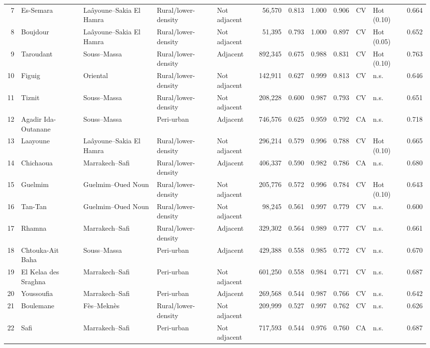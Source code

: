 \documentclass[10pt]{article}
\begin{document}
\begin{longtable}{@{}r>{\raggedright\arraybackslash}p{2.9cm}>{\raggedright\arraybackslash}p{3.3cm}llrrrrllr@{}}
7 & Es-Semara & Laâyoune--Sakia El Hamra & Rural/lower-density & Not adjacent & 56,570 & 0.813 & 1.000 & 0.906 & CV & Hot (0.10) & 0.664 \\
8 & Boujdour & Laâyoune--Sakia El Hamra & Rural/lower-density & Not adjacent & 51,395 & 0.793 & 1.000 & 0.897 & CV & Hot (0.05) & 0.652 \\
9 & Taroudant & Souss--Massa & Rural/lower-density & Adjacent & 892,345 & 0.675 & 0.988 & 0.831 & CV & Hot (0.10) & 0.763 \\
10 & Figuig & Oriental & Rural/lower-density & Not adjacent & 142,911 & 0.627 & 0.999 & 0.813 & CV & n.s. & 0.646 \\
11 & Tiznit & Souss--Massa & Rural/lower-density & Not adjacent & 208,228 & 0.600 & 0.987 & 0.793 & CV & n.s. & 0.651 \\
12 & Agadir Ida-Outanane & Souss--Massa & Peri-urban & Adjacent & 746,576 & 0.625 & 0.959 & 0.792 & CA & n.s. & 0.718 \\
13 & Laayoune & Laâyoune--Sakia El Hamra & Rural/lower-density & Not adjacent & 296,214 & 0.579 & 0.996 & 0.788 & CV & Hot (0.10) & 0.665 \\
14 & Chichaoua & Marrakech--Safi & Rural/lower-density & Adjacent & 406,337 & 0.590 & 0.982 & 0.786 & CA & n.s. & 0.680 \\
15 & Guelmim & Guelmim--Oued Noun & Rural/lower-density & Not adjacent & 205,776 & 0.572 & 0.996 & 0.784 & CV & Hot (0.10) & 0.643 \\
16 & Tan-Tan & Guelmim--Oued Noun & Rural/lower-density & Not adjacent & 98,245 & 0.561 & 0.997 & 0.779 & CV & n.s. & 0.600 \\
17 & Rhamna & Marrakech--Safi & Rural/lower-density & Adjacent & 329,302 & 0.564 & 0.989 & 0.777 & CV & n.s. & 0.661 \\
18 & Chtouka-Ait Baha & Souss--Massa & Peri-urban & Adjacent & 429,388 & 0.558 & 0.985 & 0.772 & CV & n.s. & 0.670 \\
19 & El Kelaa des Sraghna & Marrakech--Safi & Peri-urban & Not adjacent & 601,250 & 0.558 & 0.984 & 0.771 & CV & n.s. & 0.687 \\
20 & Youssoufia & Marrakech--Safi & Peri-urban & Adjacent & 269,568 & 0.544 & 0.987 & 0.766 & CV & n.s. & 0.642 \\
21 & Boulemane & Fès--Meknès & Rural/lower-density & Not adjacent & 209,999 & 0.527 & 0.997 & 0.762 & CV & n.s. & 0.626 \\
22 & Safi & Marrakech--Safi & Peri-urban & Not adjacent & 717,593 & 0.544 & 0.976 & 0.760 & CA & n.s. & 0.687 \\

\end{longtable}
\end{document}
